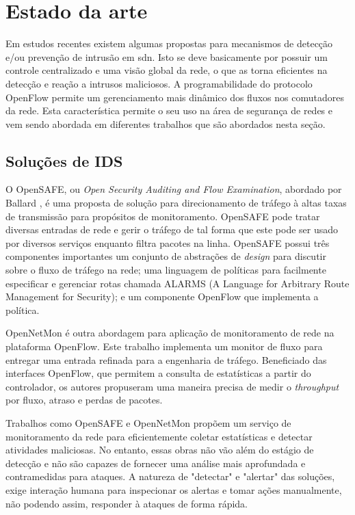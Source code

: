 \chapter{Estado da arte}
\label{cap:trabalhos-relacionados}

Em estudos recentes existem algumas propostas para mecanismos de detecção e/ou prevenção de intrusão em \gls{sdn}. Isto se deve basicamente por possuir um controle centralizado e uma visão global da rede, o que as torna eficientes na detecção e reação a intrusos maliciosos. A programabilidade do protocolo OpenFlow permite um gerenciamento mais dinâmico dos fluxos nos comutadores da rede. Esta característica permite o seu uso na área de segurança de redes e vem sendo abordada em diferentes trabalhos que são abordados nesta seção.

\section{Soluções de IDS}

O OpenSAFE, ou \textit{Open Security Auditing and Flow Examination}, abordado por Ballard \cite{Ballard:2010}, é uma proposta de solução para direcionamento de tráfego à altas taxas de transmissão para propósitos de monitoramento. OpenSAFE pode tratar diversas entradas de rede e gerir o tráfego de tal forma que este pode ser usado por diversos serviços enquanto filtra pacotes na linha. 
OpenSAFE possui três componentes importantes um conjunto de abstrações de \textit{design} para discutir sobre o fluxo de tráfego na rede; uma linguagem de políticas para facilmente especificar e gerenciar rotas chamada ALARMS (A Language for Arbitrary Route Management for Security); e um componente OpenFlow que implementa a política. 

OpenNetMon \cite{Adrichem:2014} é outra abordagem para aplicação de monitoramento de rede na plataforma OpenFlow. Este trabalho implementa um monitor de fluxo para entregar uma entrada refinada para a engenharia de tráfego. Beneficiado das interfaces OpenFlow, que permitem a consulta de estatísticas a partir do controlador, os autores propuseram uma maneira precisa de medir o \textit{throughput} por fluxo, atraso e perdas de pacotes.

Trabalhos como OpenSAFE \cite{Ballard:2010} e OpenNetMon \cite{Adrichem:2014} propõem um serviço de monitoramento da rede para eficientemente coletar estatísticas e detectar atividades maliciosas. No entanto, essas obras não vão além do estágio de detecção e não são capazes de fornecer uma análise mais aprofundada e contramedidas para ataques. A natureza de "detectar" e "alertar" das soluções, exige interação humana para inspecionar os alertas e tomar ações manualmente, não podendo assim, responder à ataques de forma rápida.


